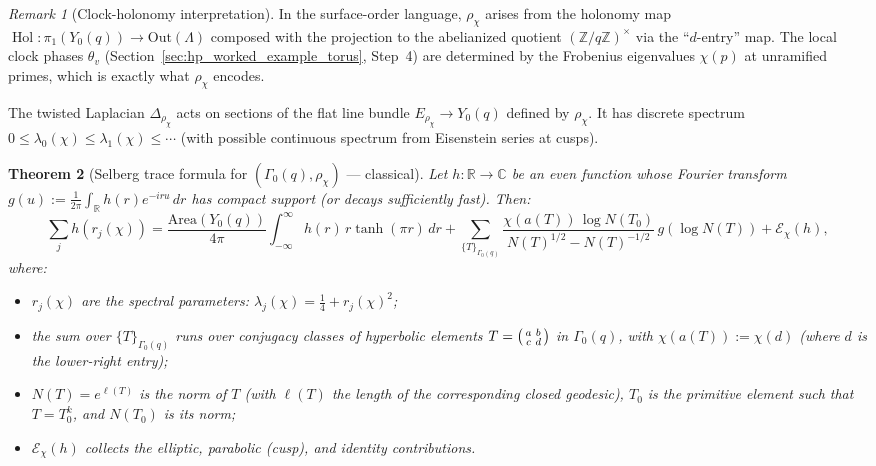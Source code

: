 \documentclass[11pt,oneside]{amsbook}
\numberwithin{equation}{section}
\theoremstyle{plain}
\newtheorem{theorem}{Theorem}[section]
\theoremstyle{definition}
\theoremstyle{remark}
\newtheorem{remark}[theorem]{Remark}
\newcommand{\Z}{\mathbb{Z}}
\newcommand{\R}{\mathbb{R}}
\newcommand{\C}{\mathbb{C}}
\DeclareMathOperator{\Hol}{\mathrm{Hol}}
\begin{document}
\begin{remark}[Clock-holonomy interpretation]
In the surface-order language, $\rho_\chi$ arises from the holonomy map $\Hol:\pi_1(Y_0(q))\to\mathrm{Out}(\Lambda)$ composed with the projection to the abelianized quotient $(\Z/q\Z)^\times$ via the ``$d$-entry'' map.
The local clock phases $\theta_v$ (Section~\ref{sec:hp_worked_example_torus}, Step~4) are determined by the Frobenius eigenvalues $\chi(p)$ at unramified primes, which is exactly what $\rho_\chi$ encodes.
\end{remark}

The twisted Laplacian $\Delta_{\rho_\chi}$ acts on sections of the flat line bundle $E_{\rho_\chi}\to Y_0(q)$ defined by $\rho_\chi$.
It has discrete spectrum $0\le \lambda_0(\chi)\le \lambda_1(\chi)\le\cdots$ (with possible continuous spectrum from Eisenstein series at cusps).

\begin{theorem}[Selberg trace formula for $(\Gamma_0(q),\rho_\chi)$ --- classical]
\label{thm:selberg_trace_dirichlet}
Let $h:\R\to\C$ be an even function whose Fourier transform $g(u):=\frac{1}{2\pi}\int_\R h(r)e^{-iru}\,dr$ has compact support (or decays sufficiently fast).
Then:
\begin{equation}
\label{eq:selberg_trace_formula_chi}
\sum_j h(r_j(\chi))
=
\frac{\mathrm{Area}(Y_0(q))}{4\pi}\int_{-\infty}^\infty h(r)\,r\tanh(\pi r)\,dr
+ \sum_{\{T\}_{\Gamma_0(q)}} \frac{\chi(a(T))\,\log N(T_0)}{N(T)^{1/2}-N(T)^{-1/2}}\,g(\log N(T))
+ \mathcal{E}_\chi(h),
\end{equation}
where:
\begin{itemize}
\item $r_j(\chi)$ are the spectral parameters: $\lambda_j(\chi)=\frac{1}{4}+r_j(\chi)^2$;
\item the sum over $\{T\}_{\Gamma_0(q)}$ runs over conjugacy classes of hyperbolic elements $T=\begin{psmallmatrix}a&b\\c&d\end{psmallmatrix}$ in $\Gamma_0(q)$, with $\chi(a(T)):=\chi(d)$ (where $d$ is the lower-right entry);
\item $N(T)=e^{\ell(T)}$ is the norm of $T$ (with $\ell(T)$ the length of the corresponding closed geodesic), $T_0$ is the primitive element such that $T=T_0^k$, and $N(T_0)$ is its norm;
\item $\mathcal{E}_\chi(h)$ collects the elliptic, parabolic (cusp), and identity contributions.
\end{itemize}
\end{theorem}
\end{document}
